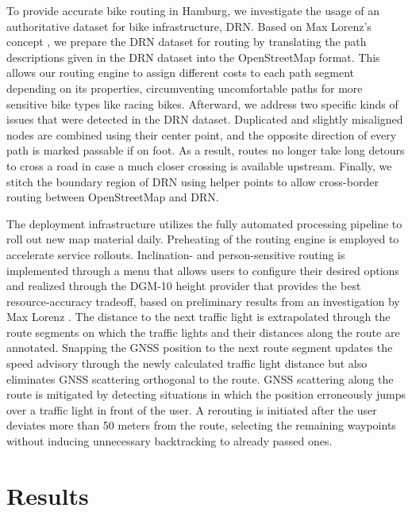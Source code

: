 \begin{Summary}
To provide accurate bike routing in Hamburg, we investigate the usage of an authoritative dataset for bike infrastructure, DRN. Based on Max Lorenz's concept \cite{lorenz_2022}, we prepare the DRN dataset for routing by translating the path descriptions given in the DRN dataset into the OpenStreetMap format. This allows our routing engine to assign different costs to each path segment depending on its properties, circumventing uncomfortable paths for more sensitive bike types like racing bikes. Afterward, we address two specific kinds of issues that were detected in the DRN dataset. Duplicated and slightly misaligned nodes are combined using their center point, and the opposite direction of every path is marked passable if on foot. As a result, routes no longer take long detours to cross a road in case a much closer crossing is available upstream. Finally, we stitch the boundary region of DRN using helper points to allow cross-border routing between OpenStreetMap and DRN. 

The deployment infrastructure utilizes the fully automated processing pipeline to roll out new map material daily. Preheating of the routing engine is employed to accelerate service rollouts. Inclination- and person-sensitive routing is implemented through a menu that allows users to configure their desired options and realized through the DGM-10 height provider that provides the best resource-accuracy tradeoff, based on preliminary results from an investigation by Max Lorenz \cite{lorenz_2022}. The distance to the next traffic light is extrapolated through the route segments on which the traffic lights and their distances along the route are annotated. Snapping the GNSS position to the next route segment updates the speed advisory through the newly calculated traffic light distance but also eliminates GNSS scattering orthogonal to the route. GNSS scattering along the route is mitigated by detecting situations in which the position erroneously jumps over a traffic light in front of the user. A rerouting is initiated after the user deviates more than 50 meters from the route, selecting the remaining waypoints without inducing unnecessary backtracking to already passed ones. 
\end{Summary}

\section{Results}

